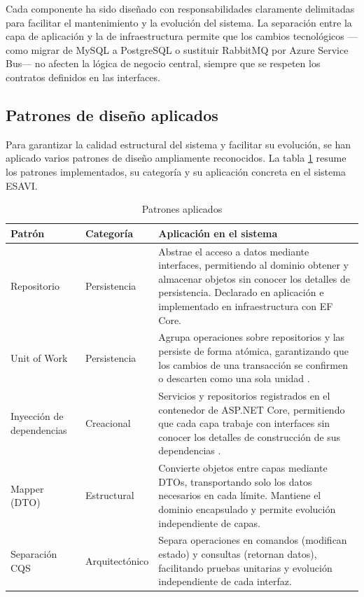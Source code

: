 \documentclass[12pt,letterpaper]{article}
\begin{document}
Cada componente ha sido diseñado con responsabilidades claramente delimitadas para facilitar el mantenimiento y la evolución del sistema. La separación entre la capa de aplicación y la de infraestructura permite que los cambios tecnológicos —como migrar de MySQL a PostgreSQL o sustituir RabbitMQ por Azure Service Bus— no afecten la lógica de negocio central, siempre que se respeten los contratos definidos en las interfaces.

\subsection{Patrones de diseño aplicados}

Para garantizar la calidad estructural del sistema y facilitar su evolución, se han aplicado varios patrones de diseño ampliamente reconocidos. La tabla \ref{tab:patrones} resume los patrones implementados, su categoría y su aplicación concreta en el sistema ESAVI.

\begin{table}[H]
\centering
\caption{Patrones aplicados}
\label{tab:patrones}
\begin{tabular}{|l|p{2.6cm}|p{8.4cm}|}
\hline
\textbf{Patrón} & \textbf{Categoría} & \textbf{Aplicación en el sistema} \\ \hline
Repositorio & Persistencia & Abstrae el acceso a datos mediante interfaces, permitiendo al dominio obtener y almacenar objetos sin conocer los detalles de persistencia. Declarado en aplicación e implementado en infraestructura con EF Core. \\ \hline
Unit of Work & Persistencia & Agrupa operaciones sobre repositorios y las persiste de forma atómica, garantizando que los cambios de una transacción se confirmen o descarten como una sola unidad . \\ \hline
Inyección de dependencias & Creacional & Servicios y repositorios registrados en el contenedor de ASP.NET Core, permitiendo que cada capa trabaje con interfaces sin conocer los detalles de construcción de sus dependencias . \\ \hline
Mapper (DTO) & Estructural & Convierte objetos entre capas mediante DTOs, transportando solo los datos necesarios en cada límite. Mantiene el dominio encapsulado y permite evolución independiente de capas. \\ \hline
Separación CQS & Arquitectónico & Separa operaciones en comandos (modifican estado) y consultas (retornan datos), facilitando pruebas unitarias y evolución independiente de cada interfaz. \\ \hline
\end{tabular}
\end{table}
\end{document}
